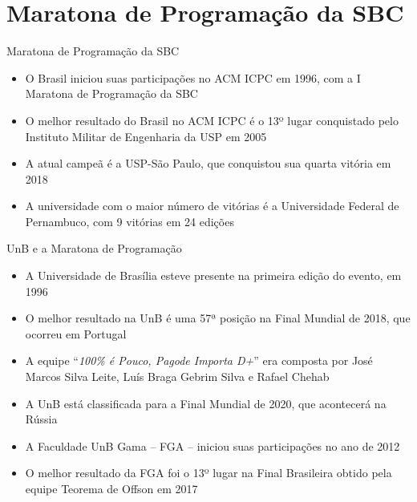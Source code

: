 \section{Maratona de Programação da SBC}

\begin{frame}[fragile]{Maratona de Programação da SBC}

    \begin{itemize}
        \item O Brasil iniciou suas participações no ACM ICPC em 1996, com a I Maratona de
            Programação da SBC
        \item O melhor resultado do Brasil no ACM ICPC é o 13º lugar conquistado pelo 
            Instituto Militar de Engenharia da USP em 2005
        \item A atual campeã é a USP-São Paulo, que conquistou sua quarta vitória em 2018
        \item A universidade com o maior número de vitórias é a Universidade Federal de
            Pernambuco, com 9 vitórias em 24 edições
    \end{itemize}

\end{frame}

\begin{frame}[fragile]{UnB e a Maratona de Programação}

    \begin{itemize}
        \item A Universidade de Brasília esteve presente na primeira edição do evento, em 1996
        \item O melhor resultado na UnB é uma 57ª posição na Final Mundial de 2018, que ocorreu
            em Portugal

        \item A equipe ``\textit{100\% é Pouco, Pagode Importa D+}'' era composta por José Marcos 
            Silva Leite, Luís Braga Gebrim Silva e Rafael Chehab 

        \item A UnB está classificada para a Final Mundial de 2020, que acontecerá na Rússia
        \item A Faculdade UnB Gama -- FGA -- iniciou suas participações no ano de 2012
        \item O melhor resultado da FGA foi o 13º lugar na Final Brasileira obtido pela equipe 
            Teorema de Offson em 2017
    \end{itemize}

\end{frame}
